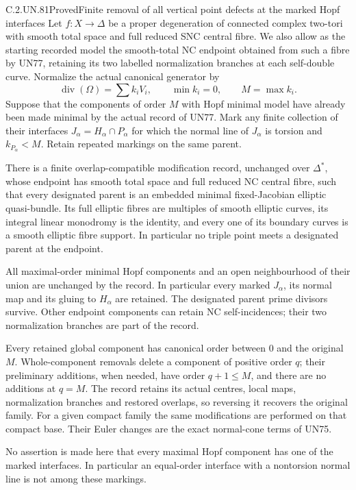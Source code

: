 \begin{statement}{C.2.UN.81}{Proved}{Finite removal of all vertical point defects at the marked Hopf interfaces}
Let \(f:X\to\Delta\) be a proper degeneration of connected
complex two-tori with smooth total space and full reduced
SNC central fibre. We also allow as the starting recorded model
the smooth-total NC endpoint obtained from such a fibre by
UN77, retaining its two labelled normalization branches at
each self-double curve. Normalize the actual canonical generator by
\[
 \operatorname{div}(\Omega)=\sum k_iV_i,\qquad
 \min k_i=0,\qquad M=\max k_i.
 \tag{C.AP.1}
\]
Suppose that the components of order \(M\) with Hopf minimal
model have already been made minimal by the actual record of
UN77. Mark any finite collection of their interfaces
\(J_\alpha=H_\alpha\cap P_\alpha\) for which the normal line of
\(J_\alpha\) is torsion and \(k_{P_\alpha}<M\).
Retain repeated markings on the same parent.

There is a finite overlap-compatible modification record,
unchanged over \(\Delta^*\), whose endpoint has smooth total
space and full reduced NC central fibre, such that every
designated parent is an embedded minimal fixed-Jacobian
elliptic quasi-bundle. Its full elliptic fibres are multiples
of smooth elliptic curves, its integral linear monodromy is
the identity, and every one of its boundary curves is a
smooth elliptic fibre support. In particular no triple point
meets a designated parent at the endpoint.

All maximal-order minimal Hopf components and an open
neighbourhood of their union are unchanged by the record.
In particular every marked \(J_\alpha\), its normal map and
its gluing to \(H_\alpha\) are retained. The designated parent
prime divisors survive. Other endpoint components can retain
NC self-incidences; their two normalization branches are
part of the record.

Every retained global component has canonical order between
\(0\) and the original \(M\). Whole-component removals delete
a component of positive order \(q\); their preliminary
additions, when needed, have order \(q+1\le M\), and there
are no additions at \(q=M\). The record retains its actual
centres, local maps, normalization branches and restored
overlaps, so reversing it recovers the original family.
For a given compact family the same modifications are
performed on that compact base. Their Euler changes are
the exact normal-cone terms of UN75.

No assertion is made here that every maximal Hopf component
has one of the marked interfaces. In particular an
equal-order interface with a nontorsion normal line is not
among these markings.
\end{statement}


